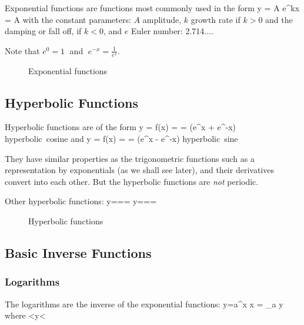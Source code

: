 Exponential functions are functions most commonly used in the form
\bnn y = A e^{kx} = A  \enn
with the constant parameters: $A$ amplitude, $k$ growth rate if $k>0$ and the damping or fall 
off, if $k<0$, and $e$ Euler number: 2.714....

Note that $e^0=1\;$ and $\;e^{-x}=\frac{1}{e^x}$. \svs

\begin{figure}[!h]
    \centerline{\epsfxsize=10cm }
    \caption{Exponential functions} \label{fig13}
\end{figure} \vs


\subsection{Hyperbolic Functions}

Hyperbolic functions are of the form
\bnn y = f(x) =  = (e^x + e^{-x}) \qquad\mbox{hyperbolic cosine} \enn
and
\bnn y = f(x) =  = (e^x - e^{-x}) \qquad\mbox{hyperbolic sine} \enn

They have similar properties as the trigonometric functions such as a representation by
exponentials (as we shall see later), and their derivatives convert into each other. 
But the hyperbolic functions are {\em not} periodic. \vs

Other hyperbolic functions:
\bnn
y=== \qquad
y===
\enn

\begin{figure}[!h]
    \centering
    \hspace*{0.5cm}
     \svs
    \caption{Hyperbolic functions} \label{fig14}
\end{figure} \vs



\subsection{Basic Inverse Functions}
\subsubsection{Logarithms}
The logarithms are the inverse of the exponential functions:
\bnn y=a^x \quad \leftrightarrow \quad x = \log_a y  \qquad\mbox{where} <y<\infty \enn

